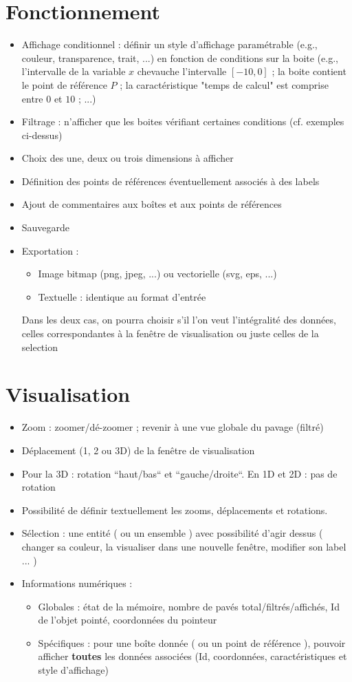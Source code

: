 \documentclass{article}
\begin{document}
\section{Fonctionnement}
\begin{itemize}
\item
Affichage conditionnel : définir un style d'affichage paramétrable (e.g., couleur, transparence, trait, ...) en fonction de conditions sur la boite (e.g., l'intervalle de la variable $x$ chevauche l'intervalle $[-10,0]$ ; la boite contient le point de référence $P$ ; la caractéristique "temps de calcul" est comprise entre $0$ et $10$ ; ...)
\item
Filtrage : n'afficher que les boites vérifiant certaines conditions (cf. exemples ci-dessus)
\item
Choix des une, deux ou trois dimensions à afficher
\item
Définition des points de références éventuellement associés à des labels
\item
Ajout de commentaires aux boîtes et aux points de références
\item
Sauvegarde
\item
Exportation :
   \begin{itemize}
   \item
   Image bitmap (png, jpeg, ...) ou vectorielle (svg, eps, ...)
   \item
   Textuelle : identique au format d'entrée
   \end{itemize}
Dans les deux cas, on pourra choisir s'il l'on veut l'intégralité des données, celles correspondantes à la fenêtre de visualisation ou juste celles de la selection
\end{itemize}

\section{Visualisation }
\begin{itemize}
\item
Zoom : zoomer/dé-zoomer ; revenir à une vue globale du pavage (filtré)
\item
Déplacement (1, 2 ou 3D) de la fenêtre de visualisation
\item
Pour la 3D : rotation ``haut/bas`` et  ``gauche/droite``. En 1D et 2D : pas de rotation
\item
Possibilité de définir textuellement les zooms, déplacements et rotations.
\item
Sélection : une entité ( ou un ensemble ) avec possibilité d'agir dessus ( changer sa couleur, la visualiser dans une nouvelle fenêtre, modifier son label ... )
\item
Informations numériques :
  \begin{itemize}
  \item Globales : état de la mémoire, nombre de pavés total/filtrés/affichés, Id de l'objet pointé, coordonnées du pointeur
  \item Spécifiques : pour une boîte donnée ( ou un point de référence ), pouvoir afficher \textbf{toutes} les données associées (Id, coordonnées, caractéristiques et style d'affichage)
  \end{itemize}
\end{itemize}
\end{document}
